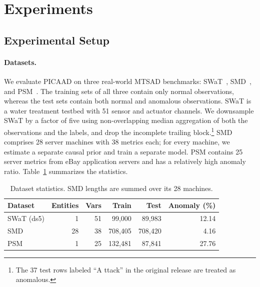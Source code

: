 \documentclass[letterpaper]{article}
\begin{document}
\section{Experiments}

\subsection{Experimental Setup}

\paragraph{Datasets.}
We evaluate PICAAD on three real-world MTSAD benchmarks: SWaT~\cite{goh2017swat}, SMD~\cite{su2019omni}, and PSM~\cite{abdulaal2021psm}. The training sets of all three contain only normal observations, whereas the test sets contain both normal and anomalous observations. SWaT is a water treatment testbed with 51 sensor and actuator channels. We downsample SWaT by a factor of five using non-overlapping median aggregation of both the observations and the labels, and drop the incomplete trailing block.\footnote{The 37 test rows labeled ``A ttack'' in the original release are treated as anomalous.} SMD comprises 28 server machines with 38 metrics each; for every machine, we estimate a separate causal prior and train a separate model. PSM contains 25 server metrics from eBay application servers and has a relatively high anomaly ratio. Table~\ref{tab:datasets} summarizes the statistics.

\begin{table}[t]
\centering
\caption{Dataset statistics. SMD lengths are summed over its 28 machines.}
\label{tab:datasets}
\small
\setlength{\tabcolsep}{4pt}
\begin{tabular}{lrrrrr}
\toprule
Dataset & Entities & Vars & Train & Test & Anomaly (\%) \\
\midrule
SWaT (ds5) & 1  & 51 & 99{,}000  & 89{,}983  & 12.14 \\
SMD        & 28 & 38 & 708{,}405 & 708{,}420 & 4.16 \\
PSM        & 1  & 25 & 132{,}481 & 87{,}841  & 27.76 \\
\bottomrule
\end{tabular}
\end{table}
\end{document}
